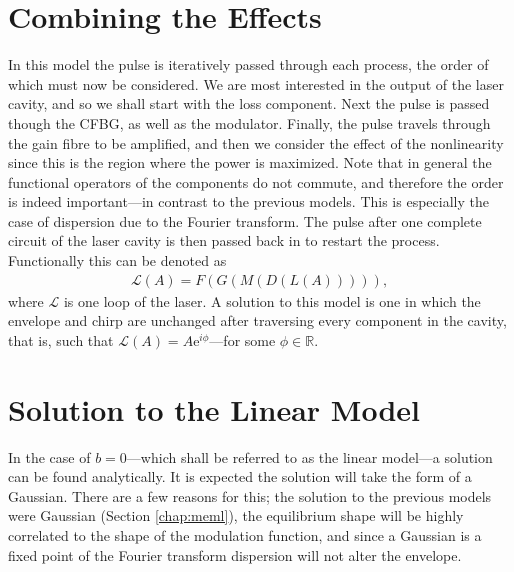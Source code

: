 \section{Combining the Effects}
\label{sec:effects}
In this model the pulse is iteratively passed through each process, the order of which must now be considered. We are most interested in the output of the laser cavity, and so we shall start with the loss component. Next the pulse is passed though the CFBG, as well as the modulator. Finally, the pulse travels through the gain fibre to be amplified, and then we consider the effect of the nonlinearity since this is the region where the power is maximized. Note that in general the functional operators of the components do not commute, and therefore the order is indeed important---in contrast to the previous models. This is especially the case of dispersion due to the Fourier transform. The pulse after one complete circuit of the laser cavity is then passed back in to restart the process. Functionally this can be denoted as
\begin{align*}
	\mathcal{L}(A) = F(G(M(D(L(A))))),
\end{align*}
where $\mathcal{L}$ is one loop of the laser. A solution to this model is one in which the envelope and chirp are unchanged after traversing every component in the cavity, that is, such that $\mathcal{L}(A) = A \textrm{e}^{i \phi}$---for some $\phi \in \mathbb{R}$.

\section{Solution to the Linear Model}
\label{sec:linear}
In the case of $b = 0$---which shall be referred to as the linear model---a solution can be found analytically. It is expected the solution will take the form of a Gaussian. There are a few reasons for this; the solution to the previous models were Gaussian \cite{cutler, seigman, kuizenga1970a, martinez1984, martinez1985} (Section \ref{chap:meml}), the equilibrium shape will be highly correlated to the shape of the modulation function, and since a Gaussian is a fixed point of the Fourier transform \cite{gradshteyn} dispersion will not alter the envelope. \\

